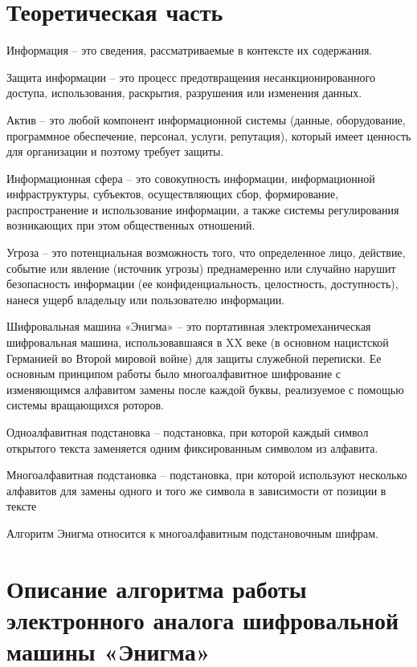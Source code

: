 \chapter{Теоретическая часть}

Информация -- это сведения, рассматриваемые в контексте их содержания.

Защита информации -- это процесс предотвращения несанкционированного доступа, использования, раскрытия, разрушения или изменения данных.

Актив -- это любой компонент информационной системы (данные, оборудование, программное обеспечение, персонал, услуги, репутация), который имеет ценность для организации и поэтому требует защиты.

Информационная сфера -- это совокупность информации, информационной инфраструктуры, субъектов, осуществляющих сбор, формирование, распространение и использование информации, а также системы регулирования возникающих при этом общественных отношений. 

Угроза -- это потенциальная возможность того, что определенное лицо, действие, событие или явление (источник угрозы) преднамеренно или случайно нарушит безопасность информации (ее конфиденциальность, целостность, доступность), нанеся ущерб владельцу или пользователю информации.

Шифровальная машина «Энигма» -- это портативная электромеханическая шифровальная машина, использовавшаяся в XX веке (в основном нацистской Германией во Второй мировой войне) для защиты служебной переписки. Ее основным принципом работы было многоалфавитное шифрование с изменяющимся алфавитом замены после каждой буквы, реализуемое с помощью системы вращающихся роторов.

Одноалфавитная подстановка -- подстановка, при которой каждый символ открытого текста заменяется одним фиксированным символом из алфавита.

Многоалфавитная подстановка -- подстановка, при которой используют несколько алфавитов для замены одного и того же символа в зависимости от позиции в тексте


Алгоритм Энигма относится к многоалфавитным подстановочным шифрам.


\chapter{Описание алгоритма работы электронного аналога шифровальной машины «Энигма»}

